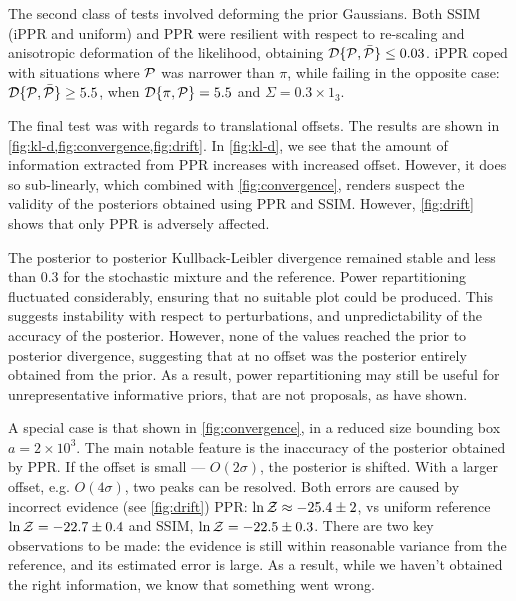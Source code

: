 \documentclass[draft,usenatbib]{mnras}
\begin{document}
The second class of tests involved deforming the prior Gaussians.
Both SSIM (iPPR and uniform) and PPR were resilient with respect to
re-scaling and anisotropic deformation of the likelihood, obtaining
\({\cal D}\{ {\cal P}, \bar{\cal P}\} \leq 0.03\). iPPR coped with
situations where \({\cal P}\) was narrower than \(\pi\), while failing in
the opposite case: \({\cal D}\{ {\cal P}, \bar{\cal P}\} \geq 5.5\),
when \({\cal D}\{ \pi, {\cal P} \} = 5.5\) and
\(\Sigma = 0.3 \times \mathrm{1}_{3}\).

The final test was with regards to translational offsets. The results
are shown in \cref{fig:kl-d,fig:convergence,fig:drift}. In
\cref{fig:kl-d}, we see that the amount of information extracted from
PPR increases with increased offset. However, it does so sub-linearly,
which combined with \cref{fig:convergence}, renders suspect the
validity of the posteriors obtained using PPR and SSIM. However,
\cref{fig:drift} shows that only PPR is adversely affected.

The posterior to posterior Kullback-Leibler divergence remained stable
and less than \(0.3\) for the stochastic mixture and the
reference. Power repartitioning fluctuated considerably, ensuring that
no suitable plot could be produced. This suggests instability with respect to
perturbations, and unpredictability of the accuracy of the
posterior. However, none of the values reached the prior to posterior
divergence, suggesting that at no offset was the posterior entirely
obtained from the prior. As a result, power repartitioning may still
be useful for unrepresentative informative priors, that are not
proposals, as \cite{chen-ferroz-hobson} have shown.

A special case is that shown in \cref{fig:convergence}, in a reduced
size bounding box \(a=2\times 10^{3}\). The main notable feature is
the inaccuracy of the posterior obtained by PPR. If the offset is
small --- \(O(2\sigma)\), the posterior is shifted. With a larger
offset, e.g. \(O(4\sigma)\), two peaks can be resolved.  Both errors
are caused by incorrect evidence (see \cref{fig:drift}) PPR:
\(\ln {\cal Z}\approx -25.4 \pm 2\), vs uniform reference
\(\ln {\cal Z} = -22.7 \pm 0.4\) and SSIM,
\(\ln {\cal Z} = -22.5 \pm 0.3\). There are two key observations to be
made: the evidence is still within reasonable variance from the
reference, and its estimated error is large. As a result, while we
haven't obtained the right information, we know that something went
wrong.
\end{document}
